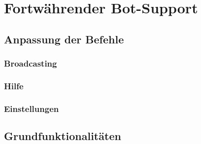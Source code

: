 \chapter{Fortwährender Bot-Support}
\section{Anpassung der Befehle}
\subsection{Broadcasting}
\subsection{Hilfe}
\subsection{Einstellungen}
\section{Grundfunktionalitäten}